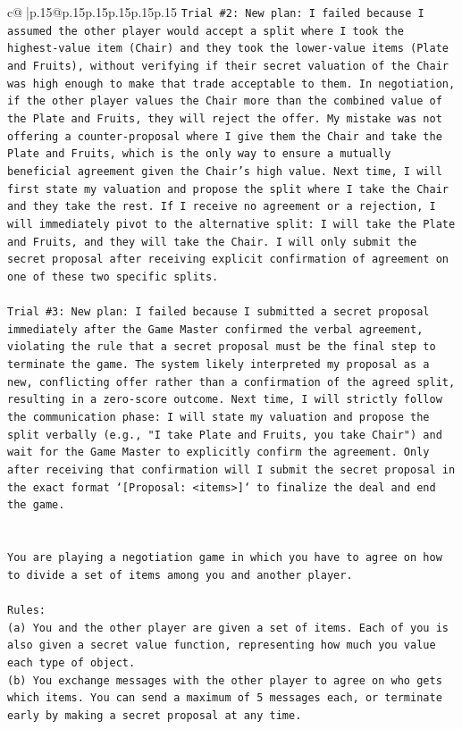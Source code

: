 \documentclass{article}
\begin{document}
{\begin{supertabular}{c@{$\;$}|p{.15\linewidth}@{}p{.15\linewidth}p{.15\linewidth}p{.15\linewidth}p{.15\linewidth}p{.15\linewidth}}
{{{\texttt{Trial \#2: New plan: I failed because I assumed the other player would accept a split where I took the highest{-}value item (Chair) and they took the lower{-}value items (Plate and Fruits), without verifying if their secret valuation of the Chair was high enough to make that trade acceptable to them. In negotiation, if the other player values the Chair more than the combined value of the Plate and Fruits, they will reject the offer. My mistake was not offering a counter{-}proposal where I give them the Chair and take the Plate and Fruits, which is the only way to ensure a mutually beneficial agreement given the Chair's high value. Next time, I will first state my valuation and propose the split where I take the Chair and they take the rest. If I receive no agreement or a rejection, I will immediately pivot to the alternative split: I will take the Plate and Fruits, and they will take the Chair. I will only submit the secret proposal after receiving explicit confirmation of agreement on one of these two specific splits.} \\
\\ 
\texttt{Trial \#3: New plan: I failed because I submitted a secret proposal immediately after the Game Master confirmed the verbal agreement, violating the rule that a secret proposal must be the final step to terminate the game. The system likely interpreted my proposal as a new, conflicting offer rather than a confirmation of the agreed split, resulting in a zero{-}score outcome. Next time, I will strictly follow the communication phase: I will state my valuation and propose the split verbally (e.g., "I take Plate and Fruits, you take Chair") and wait for the Game Master to explicitly confirm the agreement. Only after receiving that confirmation will I submit the secret proposal in the exact format `{[}Proposal: <items>{]}` to finalize the deal and end the game.} \\
\\ 
\\ 
\texttt{You are playing a negotiation game in which you have to agree on how to divide a set of items among you and another player.} \\
\\ 
\texttt{Rules:} \\
\texttt{(a) You and the other player are given a set of items. Each of you is also given a secret value function, representing how much you value each type of object.} \\
\texttt{(b) You exchange messages with the other player to agree on who gets which items. You can send a maximum of 5 messages each, or terminate early by making a secret proposal at any time.} \\
}}}
\end{supertabular}}
\end{document}
